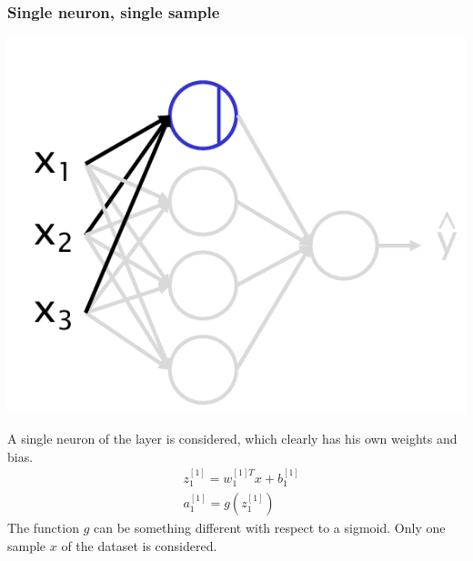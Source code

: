 \subsubsection{Single neuron, single sample}
\begin{multicols}{2}
    \begin{center}
        \includegraphics[scale=0.5]{img/2L_single.png}
    \end{center}
    \newcolumn
    A single neuron of the layer is considered, which clearly has his own weights and bias.
    \begin{equation} \label{eq:single_neuron}
        \begin{aligned}
            &z_1^{[1]}=w_1^{[1]T}{x}+b_1^{[1]}\\
            &a_1^{[1]}=g(z_1^{[1]})
        \end{aligned}
    \end{equation}
    The function $g$ can be something different with respect to a sigmoid. Only one sample $x$ of the dataset is considered.
\end{multicols}


